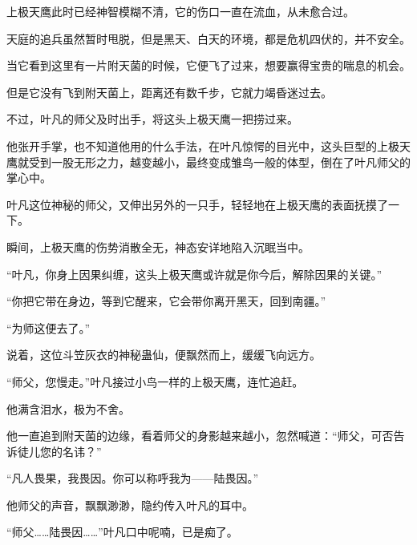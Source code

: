 \begin{this_body}
上极天鹰此时已经神智模糊不清，它的伤口一直在流血，从未愈合过。

天庭的追兵虽然暂时甩脱，但是黑天、白天的环境，都是危机四伏的，并不安全。

当它看到这里有一片附天菌的时候，它便飞了过来，想要赢得宝贵的喘息的机会。

但是它没有飞到附天菌上，距离还有数千步，它就力竭昏迷过去。

不过，叶凡的师父及时出手，将这头上极天鹰一把捞过来。

他张开手掌，也不知道他用的什么手法，在叶凡惊愕的目光中，这头巨型的上极天鹰就受到一股无形之力，越变越小，最终变成雏鸟一般的体型，倒在了叶凡师父的掌心中。

叶凡这位神秘的师父，又伸出另外的一只手，轻轻地在上极天鹰的表面抚摸了一下。

瞬间，上极天鹰的伤势消散全无，神态安详地陷入沉眠当中。

“叶凡，你身上因果纠缠，这头上极天鹰或许就是你今后，解除因果的关键。”

“你把它带在身边，等到它醒来，它会带你离开黑天，回到南疆。”

“为师这便去了。”

说着，这位斗笠灰衣的神秘蛊仙，便飘然而上，缓缓飞向远方。

“师父，您慢走。”叶凡接过小鸟一样的上极天鹰，连忙追赶。

他满含泪水，极为不舍。

他一直追到附天菌的边缘，看着师父的身影越来越小，忽然喊道：“师父，可否告诉徒儿您的名讳？”

“凡人畏果，我畏因。你可以称呼我为——陆畏因。”

他师父的声音，飘飘渺渺，隐约传入叶凡的耳中。

“师父……陆畏因……”叶凡口中呢喃，已是痴了。

\end{this_body}

